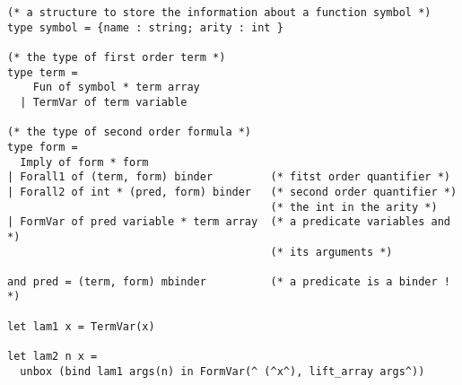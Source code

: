\documentclass[11pt]{article}
\begin{document}
\begin{verbatim}
(* a structure to store the information about a function symbol *)
type symbol = {name : string; arity : int }

(* the type of first order term *)
type term =
    Fun of symbol * term array
  | TermVar of term variable

(* the type of second order formula *)
type form =
  Imply of form * form
| Forall1 of (term, form) binder         (* fitst order quantifier *)
| Forall2 of int * (pred, form) binder   (* second order quantifier *)
                                         (* the int in the arity *)
| FormVar of pred variable * term array  (* a predicate variables and *)
                                         (* its arguments *)

and pred = (term, form) mbinder          (* a predicate is a binder ! *)

let lam1 x = TermVar(x)

let lam2 n x =
  unbox (bind lam1 args(n) in FormVar(^ (^x^), lift_array args^))
\end{verbatim}
\end{document}
